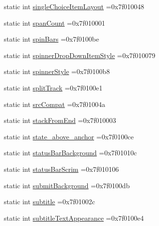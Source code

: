 \begin{DoxyCompactItemize}
\item 
static int \hyperlink{classandroid_1_1support_1_1v7_1_1appcompat_1_1R_1_1attr_abbdfaca6ed87df489ea318ca3fbebc86}{single\+Choice\+Item\+Layout} =0x7f010048
\item 
static int \hyperlink{classandroid_1_1support_1_1v7_1_1appcompat_1_1R_1_1attr_a09556cbb116dcc82ef3b65a9d4b55d8c}{span\+Count} =0x7f010001
\item 
static int \hyperlink{classandroid_1_1support_1_1v7_1_1appcompat_1_1R_1_1attr_a691f13c5cbd10190f66459c7744ea5f0}{spin\+Bars} =0x7f0100be
\item 
static int \hyperlink{classandroid_1_1support_1_1v7_1_1appcompat_1_1R_1_1attr_a07e24b4eab5f4981771950f48a1ebcf0}{spinner\+Drop\+Down\+Item\+Style} =0x7f010079
\item 
static int \hyperlink{classandroid_1_1support_1_1v7_1_1appcompat_1_1R_1_1attr_a756d2c11dcb65821e13f93739bb74526}{spinner\+Style} =0x7f0100b8
\item 
static int \hyperlink{classandroid_1_1support_1_1v7_1_1appcompat_1_1R_1_1attr_a08513fcb56feb3b7b1bd74cf05b29675}{split\+Track} =0x7f0100e1
\item 
static int \hyperlink{classandroid_1_1support_1_1v7_1_1appcompat_1_1R_1_1attr_a105b975d386211520bb1ee265d48b7b8}{src\+Compat} =0x7f01004a
\item 
static int \hyperlink{classandroid_1_1support_1_1v7_1_1appcompat_1_1R_1_1attr_a289a58377dd0ca0cc2c1a23520dc61fc}{stack\+From\+End} =0x7f010003
\item 
static int \hyperlink{classandroid_1_1support_1_1v7_1_1appcompat_1_1R_1_1attr_a2270d0961fce2e58048505a0cca06919}{state\+\_\+above\+\_\+anchor} =0x7f0100ce
\item 
static int \hyperlink{classandroid_1_1support_1_1v7_1_1appcompat_1_1R_1_1attr_ae6ea5839099a688958923fba26f61fd5}{status\+Bar\+Background} =0x7f01010c
\item 
static int \hyperlink{classandroid_1_1support_1_1v7_1_1appcompat_1_1R_1_1attr_acfaccc406e612fb6fae81417220d3286}{status\+Bar\+Scrim} =0x7f010106
\item 
static int \hyperlink{classandroid_1_1support_1_1v7_1_1appcompat_1_1R_1_1attr_a5f99a93e3f35a2e5c9938fcad7c4e711}{submit\+Background} =0x7f0100db
\item 
static int \hyperlink{classandroid_1_1support_1_1v7_1_1appcompat_1_1R_1_1attr_ab53f3a776c038849bb98b7bf21a4597f}{subtitle} =0x7f01002c
\item 
static int \hyperlink{classandroid_1_1support_1_1v7_1_1appcompat_1_1R_1_1attr_af922e4bc81d4e0f520259565bba0d869}{subtitle\+Text\+Appearance} =0x7f0100e4

\end{DoxyCompactItemize}
